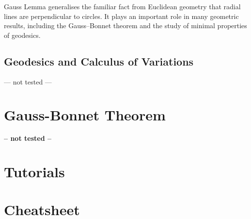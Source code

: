 \documentclass[10pt, a4paper]{article}
\theoremstyle{plain}
\theoremstyle{definition}
\theoremstyle{remark}
\newenvironment{sidenote}{%
  \par\vspace{0.5em}%
  \noindent\color{defcolor}%
}{%
  \par\vspace{0.5em}%
  \color{black}%
}
\begin{document}
\begin{sidenote}
Gauss Lemma generalises the familiar fact from Euclidean geometry that 
radial lines are perpendicular to circles. It plays an important role in 
many geometric results, including the Gauss–Bonnet theorem and the study 
of minimal properties of geodesics.
\end{sidenote}

\subsection{Geodesics and Calculus of Variations}


\begin{center}
    --- not tested ---
\end{center}





\pagebreak

\section{Gauss-Bonnet Theorem}
\begin{center}
    \textbf{-- not tested --}
\end{center}


% 
\section{Tutorials}


\pagebreak
\section{Cheatsheet}
% 
\end{document}
